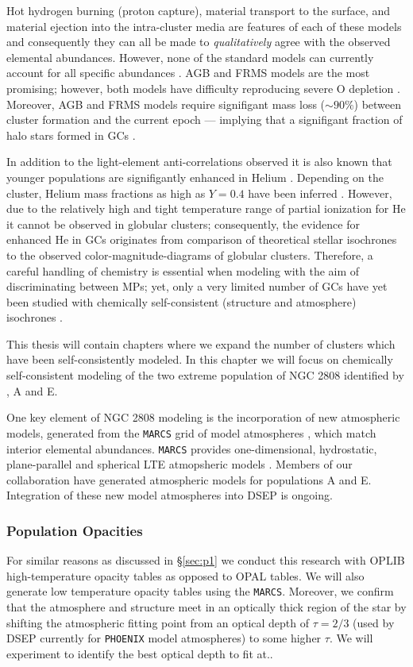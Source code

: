 Hot hydrogen burning (proton capture), material transport to the surface, and
material ejection into the intra-cluster media are features of each of these
models and consequently they can all be made to {\it qualitatively} agree with
the observed elemental abundances. However, none of the standard models can
currently account for all specific abundances \citep{Gratton2012}. AGB and FRMS
models are the most promising; however, both models have difficulty reproducing
severe O depletion \citep{Ventura2009,Decressin2007}. Moreover, AGB and FRMS
models require signifigant mass loss ($\sim 90\%$) between cluster formation
and the current epoch --- implying that a signifigant fraction of halo stars
formed in GCs \citep{Renzini2008,DErcole2008,Bastian2015}.

In addition to the light-element anti-correlations observed it is also known
that younger populations are signifigantly enhanced in Helium
\citep{Piotto2007, Piotto2015, Latour2019}. Depending on the cluster, Helium
mass fractions as high as $Y=0.4$ have been inferred \citep[e.g][]{Milone2015}.
However, due to the relatively high and tight temperature range of partial
ionization for He it cannot be observed in globular clusters; consequently, the
evidence for enhanced He in GCs originates from comparison of theoretical
stellar isochrones to the observed color-magnitude-diagrams of globular
clusters. Therefore, a careful handling of chemistry is essential when modeling
with the aim of discriminating between MPs; yet, only a very limited number of
GCs have yet been studied with chemically self-consistent (structure and
atmosphere) isochrones \citep[e.g.][NGC 6752]{Dotter2015}.

This thesis will contain chapters where we expand the number of clusters which
have been self-consistently modeled. In this chapter we will focus on
chemically self-consistent modeling of the two extreme population of NGC 2808
identified by \citep{Milone2015}, A and E.

One key element of NGC 2808 modeling is the incorporation of new atmospheric
models, generated from the \texttt{MARCS} grid of model atmospheres \citep{Plez2008},
which match interior elemental abundances. \texttt{MARCS} provides one-dimensional,
hydrostatic, plane-parallel and spherical LTE atmopsheric models
\citep{Gustafsson2008}. Members of our collaboration have generated atmospheric 
models for populations A and E.  Integration of these new model atmospheres
into DSEP is ongoing. 

\subsubsection{Population Opacities}
For similar reasons as discussed in \S\ref{sec:p1} we conduct this research
with OPLIB high-temperature opacity tables as opposed to OPAL tables. We will
also generate low temperature opacity tables using the \texttt{MARCS}.
Moreover, we confirm that the atmosphere and structure meet in an optically
thick region of the star by shifting the atmospheric fitting point from an optical
depth of $\tau = 2/3$ (used by DSEP currently for \texttt{PHOENIX} model atmospheres) to
some higher $\tau$. We will experiment to identify the best optical depth to
fit at.. 

